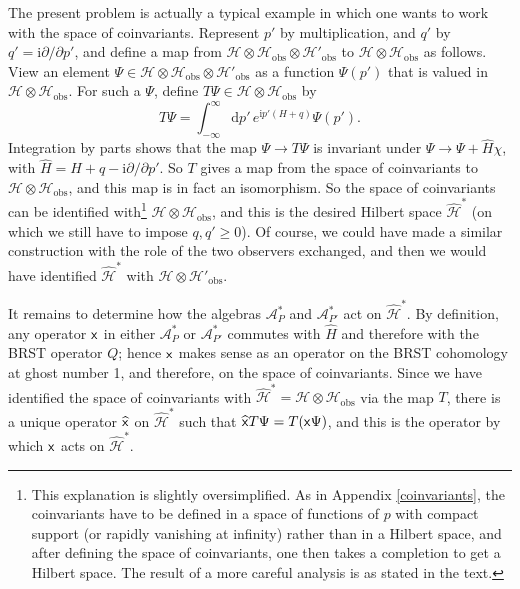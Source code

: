 \documentclass[11pt,a4paper]{article}
\def\x{{\sf x}}
\def\be{\begin{equation}}
\def\ee{\end{equation}}
\def\h{\widehat}
\def\A{{\mathcal A}}
\def\d{{\mathrm d}}
\def\h{\widehat}
\def\H{{\mathcal H}}
\def\obs{{\mathrm{obs}}}
\def\i{{\mathrm i}}
\begin{document}
The present problem is actually a typical example in which one wants to work with the space of coinvariants.    Represent $p'$ by 
multiplication, and $q'$ by  $q'=\i\partial/\partial p'$, and define a map from $\H\otimes \H_\obs \otimes \H'_\obs $ to $\H\otimes \H_\obs$ as follows.   
View an element $\Psi\in \H\otimes \H_\obs\otimes \H'_\obs$
as a function $\Psi(p')$ that is valued in $\H\otimes \H_\obs$.   For such a $\Psi$, define $T\Psi\in \H\otimes \H_\obs$ by
\be\label{deftop}T\Psi=\int_{-\infty}^\infty \d p' \,e^{\i p'(H+q)} \Psi(p'). \ee
Integration by parts shows that the map $\Psi\to T\Psi$ is invariant under $\Psi\to \Psi+\h H\chi$, with $\h H=H+q-\i \partial/\partial p'$.   
So $T$ gives a map from the space of coinvariants to $\H\otimes \H_\obs$, and this map is in fact an isomorphism.   So the space of coinvariants
can be identified with\footnote{This explanation is slightly oversimplified.   As in Appendix \ref{coinvariants}, the
 coinvariants have to be defined in a space of functions of $p$ with compact
support (or rapidly vanishing at infinity) rather than in a Hilbert space, and after defining the space of coinvariants, one then takes a completion to 
get a Hilbert space.   The result of a more careful analysis is as stated in the text.} $\H\otimes \H_\obs$, and this is the desired Hilbert space  $\h \H^*$ (on which we still have to impose $q,q'\geq 0$).   
Of course, we could have made a similar
construction with the role of the two observers exchanged, and then we would have identified $\h\H^*$ with $\H\otimes \H'_\obs$.

It remains to determine how the algebras $\A_P^*$ and $\A_{P'}^*$ act on $\h \H^*$.  By definition, any operator $\x$ in either $\A_P^*$ or $\A_{P'}^*$ commutes
with $\h H$ and therefore with the BRST operator $Q$; hence $\x$ makes sense as an operator on the BRST cohomology at ghost number 1, and therefore, on the space
of coinvariants.   Since we have identified the space of coinvariants with $\h\H^*=\H\otimes \H_\obs$ via the map $T$, there is a unique operator $\h \x$ on $\h\H^*$ such 
that $\h \x T\Psi =T(\x \Psi)$, and this is the operator by which $\x$ acts on $\h \H^*$.
\end{document}
